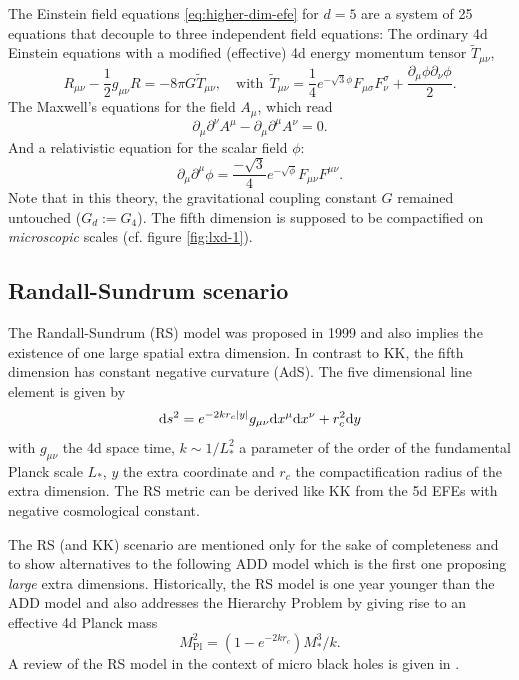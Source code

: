 \documentclass[12pt,a4paper]{report}
\numberwithin{equation}{chapter}
\begin{document}
\begin{appendices}
The Einstein field equations \eqref{eq:higher-dim-efe} for $d=5$ are a system of 25 equations that decouple to three independent field equations: The ordinary 4d Einstein equations with a modified (effective) 4d energy momentum tensor $\tilde T_{\mu\nu}$,
\begin{equation}
R_{\mu\nu} - \frac 12 g_{\mu\nu} R = -8\pi G \tilde T_{\mu\nu}, \quad\text{with}~~
\tilde T_{\mu\nu} = \frac 14 e^{-\sqrt 3 \phi} F_{\mu\sigma} F^\sigma_\nu + \frac{\partial_\mu \phi \partial_\nu \phi}{2}.
\end{equation}
The Maxwell's equations for the field $A_\mu$, which read
\begin{equation}
\partial_\mu \partial^\nu A^\mu
- \partial_\mu \partial^\mu A^\nu = 0.
\end{equation}
And a relativistic equation for the scalar field $\phi$:
\begin{equation}
\partial_\mu \partial^\mu \phi = \frac{-\sqrt 3 }{4}
e^{-\sqrt \phi} F_{\mu\nu} F^{\mu\nu}.
\end{equation}
Note that in this theory, the gravitational coupling constant $G$ remained untouched ($G_d:=G_4$). The fifth dimension is supposed to be compactified on \emph{microscopic} scales (cf. figure \ref{fig:lxd-1}).

\subsection{Randall-Sundrum scenario}
The Randall-Sundrum (RS) model was proposed in 1999 and also implies the existence of one large spatial extra dimension. In contrast to KK, the fifth dimension has constant negative curvature (AdS). The five dimensional line element is given by \cite{Kanti2014}
\begin{equation}
\mathrm{d} s^2 = e^{-2 k r_c |y|} g_{\mu\nu} \mathrm{d} x^\mu \mathrm{d} x^\nu + r_c^2 \mathrm{d} y
\end{equation}
with $g_{\mu\nu}$ the 4d space time, $k \sim 1/L_*^2$ a parameter of the order of the fundamental Planck scale $L_*$, $y$ the extra coordinate and $r_c$ the compactification radius of the extra dimension. The RS metric can be derived like KK from the 5d EFEs with negative cosmological constant.

The RS (and KK) scenario are mentioned only for the sake of completeness and to show alternatives to the following ADD model which is the first one proposing \emph{large} extra dimensions. Historically, the RS model is one year younger than the ADD model and also addresses the Hierarchy Problem by giving rise to an effective 4d Planck mass
\begin{equation}
M_\text{Pl}^2 = (1 - e^{-2 k r_c}) M_*^3 / k.
\end{equation}
A review of the RS model in the context of micro black holes is given in \cite{Kanti2014}.


\end{appendices}
\end{document}
